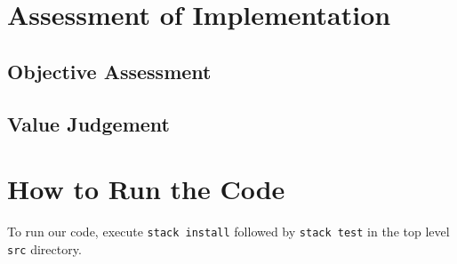 \documentclass{article}
\begin{document}
\section{Assessment of Implementation}
\subsection{Objective Assessment}


\subsection{Value Judgement}


\section{How to Run the Code}
To run our code, execute \texttt{stack install} followed by \texttt{stack test} in the top level \texttt{src} directory.
\end{document}
